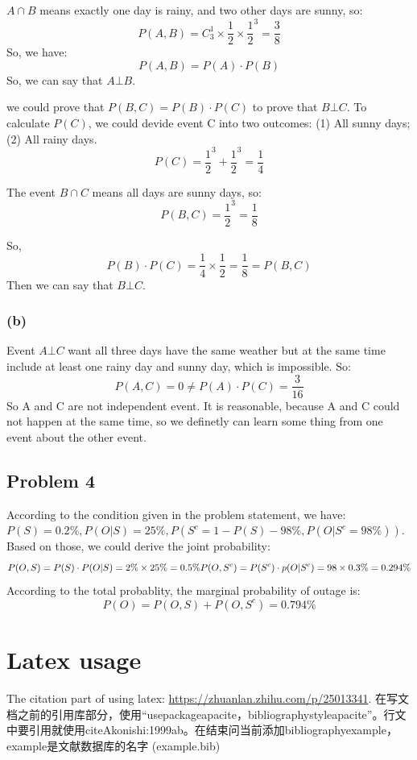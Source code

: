 \documentclass[a4paper]{article}
\begin{document}
$A \cap B$ means exactly one day is rainy, and two other days are sunny, so:
\begin{equation}
	P(A,B)=C_{3}^{1} \times \frac{1}{2} \times \frac{1}{2}^{3}=\frac{3}{8}
\end{equation}
So, we have:
\begin{equation}
	P(A,B)=P(A)\cdot P(B)
\end{equation}
So, we can say that $A \bot B$.

we could prove that $P(B,C)=P(B)\cdot P(C)$ to prove that $B \bot C$.
To calculate $P(C)$, we could devide event C into two outcomes: (1) All sunny days; (2) All rainy days.
\begin{equation}
	P(C)=\frac{1}{2}^{3}+\frac{1}{2}^{3}=\frac{1}{4}
\end{equation}

The event $B \cap C$ means all days are sunny days, so:
\begin{equation}
	P(B,C)=\frac{1}{2}^{3}=\frac{1}{8}
\end{equation}

So, 
\begin{equation}
	P(B)\cdot P(C)=\frac{1}{4} \times \frac{1}{2}=\frac{1}{8}=P(B,C)
\end{equation}
Then we can say that $B \bot C$.
\subsubsection{(b)}
Event $A \bot C$ want all three days have the same weather but at the same time include at least one rainy day and sunny day, which is impossible. So:
\begin{equation}
	P(A,C)=0 \neq P(A)\cdot P(C)=\frac{3}{16}
\end{equation}
So A and C are not independent event. It is reasonable, because A and C could not happen at the same time, so we definetly can learn some thing from one event about the other event.

\subsection{Problem 4}
According to the condition given in the problem statement, we have: $P(S)=0.2 \%, P(O|S)=25 \%, P(S^{c}=1-P(S)-98 \%, P(O|S^{c}=98 \%))$. Based on those, we could derive the joint probability:
\begin{equation}
	P(O,S)=P(S)\cdot P(O|S)=2 \% \times 25 \% =0.5 \%\\
	P(O,S^{c})=P(S^{c}) \cdot p(O|S^{c})=98 \times 0.3 \%=0.294\%
\end{equation}
According to the total probablity, the marginal probability of outage is:
\begin{equation}
	P(O)=P(O,S)+P(O,S^{c})=0.794\%
\end{equation}

\section{Latex usage}
The citation part of using latex: \url{https://zhuanlan.zhihu.com/p/25013341}.
在写文档之前的引用库部分，使用“usepackage{apacite}，bibliographystyle{apacite}”。行文中要引用就使用citeA{konishi:1999ab}。在结束问当前添加bibliography{example}，example是文献数据库的名字 (example.bib)



\end{document}

